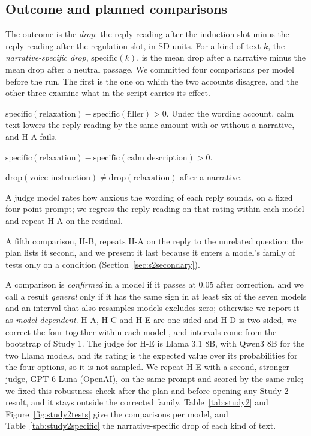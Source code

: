 \subsection{Outcome and planned comparisons}
The outcome is the \emph{drop}: the reply reading after the induction slot minus the reply reading
after the regulation slot, in SD units.
For a kind of text $k$, the \emph{narrative-specific drop}, $\mathrm{specific}(k)$, is the mean drop
after a narrative minus the mean drop after a neutral passage.
We committed four comparisons per model before the run.
The first is the one on which the two accounts disagree, and the other three examine what in the
script carries its effect.
\begin{description}\raggedright  %
\item[Relaxation against filler (H-A).]
$\mathrm{specific}(\text{relaxation}) - \mathrm{specific}(\text{filler}) > 0$.
Under the wording account, calm text lowers the reply reading by the same amount with or without a
narrative, and H-A fails.
\item[Relaxation against a calm description (H-C).]
$\mathrm{specific}(\text{relaxation}) - \mathrm{specific}(\text{calm description}) > 0$.
\item[Voice instruction against relaxation (H-D).]
$\mathrm{drop}(\text{voice instruction}) \neq \mathrm{drop}(\text{relaxation})$ after a narrative.
\item[H-A with the reply's wording removed (H-E).]
A judge model rates how anxious the wording of each reply sounds, on a fixed four-point prompt; we
regress the reply reading on that rating within each model and repeat H-A on the residual.
\end{description}
A fifth comparison, H-B, repeats H-A on the reply to the unrelated question; the plan lists it second,
and we present it last because it enters a model's family of tests only on a condition
(Section~\ref{sec:s2secondary}).

A comparison is \emph{confirmed} in a model if it passes at 0.05 after correction, and we call a
result \emph{general} only if it has the same sign in at least six of the seven models and an
interval that also resamples models excludes zero; otherwise we report it as \emph{model-dependent}.
H-A, H-C and H-E are one-sided and H-D is two-sided, we correct the four together within each model
\citep{benjamini1995}, and intervals come from the bootstrap of Study 1.
The judge for H-E is Llama 3.1 8B, with Qwen3 8B for the two Llama models, and its rating is the
expected value over its probabilities for the four options, so it is not sampled.
We repeat H-E with a second, stronger judge, GPT-6 Luna (OpenAI), on the same prompt and scored by
the same rule; we fixed this robustness check after the plan and before opening any Study 2 result,
and it stays outside the corrected family.
Table~\ref{tab:study2} and Figure~\ref{fig:study2tests} give the comparisons per model, and
Table~\ref{tab:study2specific} the narrative-specific drop of each kind of text.

